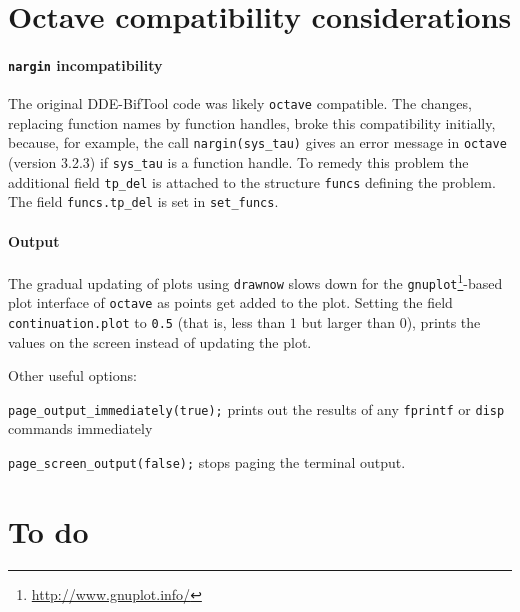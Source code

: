 \documentclass[11pt]{scrartcl}
\newcommand{\blist}[1]{\mbox{\lstinline!#1!}}
\begin{document}
\section{Octave compatibility considerations}
\label{sec:octave}

\paragraph{\blist{nargin} incompatibility}
The original DDE-BifTool code was likely
\texttt{octave}
compatible. The changes, replacing function names by function handles,
broke this compatibility initially, because, for example, the call
\blist{nargin(sys_tau)} gives an error message in \texttt{octave}
(version 3.2.3) if \blist{sys_tau} is a function handle. To remedy
this problem the additional field \blist{tp_del} is attached to the
structure \blist{funcs} defining the problem. The field
\blist{funcs.tp_del} is set in \blist{set_funcs}.

\paragraph{Output}
The gradual updating of plots using \blist{drawnow} slows down for the
\texttt{gnuplot}\footnote{\url{http://www.gnuplot.info/}}-based plot
interface of \texttt{octave} as points get added to the plot. Setting
the field \blist{continuation.plot} to \blist{0.5} (that is, less than
$1$ but larger than $0$), prints the values on the screen instead of
updating the plot.

Other useful options:
\begin{compactitem}
\item \blist{page_output_immediately(true);} prints out the results of any
  \blist{fprintf} or \blist{disp} commands immediately
\item \blist{page_screen_output(false);} stops paging the terminal output.
\end{compactitem}

\section{To do}
\label{sec:todo}
\end{document}
